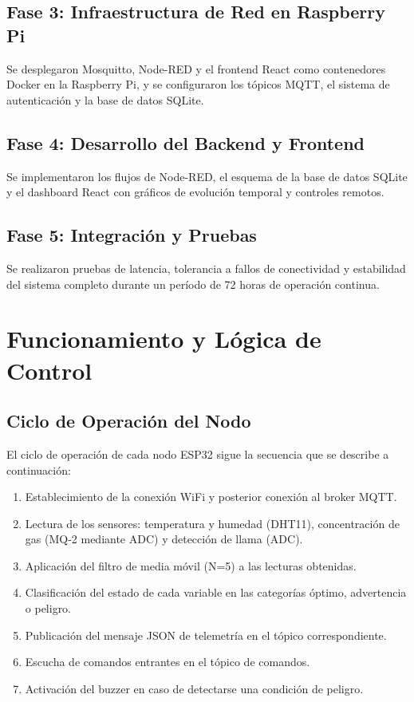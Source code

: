\documentclass[11pt,a4paper]{article}
\begin{document}
\subsection{Fase 3: Infraestructura de Red en Raspberry Pi}
Se desplegaron Mosquitto, Node-RED y el frontend React como contenedores Docker en la Raspberry Pi, y se configuraron los t\'opicos MQTT, el sistema de autenticaci\'on y la base de datos SQLite.

\subsection{Fase 4: Desarrollo del Backend y Frontend}
Se implementaron los flujos de Node-RED, el esquema de la base de datos SQLite y el dashboard React con gr\'aficos de evoluci\'on temporal y controles remotos.

\subsection{Fase 5: Integraci\'on y Pruebas}
Se realizaron pruebas de latencia, tolerancia a fallos de conectividad y estabilidad del sistema completo durante un per\'iodo de 72 horas de operaci\'on continua.

\section{Funcionamiento y L\'ogica de Control}

\subsection{Ciclo de Operaci\'on del Nodo}
El ciclo de operaci\'on de cada nodo ESP32 sigue la secuencia que se describe a continuaci\'on:
\begin{enumerate}
    \item Establecimiento de la conexi\'on WiFi y posterior conexi\'on al broker MQTT.
    \item Lectura de los sensores: temperatura y humedad (DHT11), concentraci\'on de gas (MQ-2 mediante ADC) y detecci\'on de llama (ADC).
    \item Aplicaci\'on del filtro de media m\'ovil (N=5) a las lecturas obtenidas.
    \item Clasificaci\'on del estado de cada variable en las categor\'ias \'optimo, advertencia o peligro.
    \item Publicaci\'on del mensaje JSON de telemetr\'ia en el t\'opico correspondiente.
    \item Escucha de comandos entrantes en el t\'opico de comandos.
    \item Activaci\'on del buzzer en caso de detectarse una condici\'on de peligro.
\end{enumerate}
\end{document}
